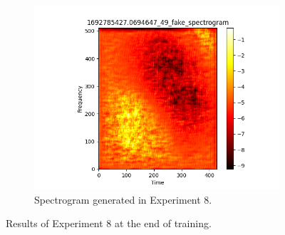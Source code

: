 \begin{figure}[!ht]
\begin{subfigure}{0.3\textwidth}
        \includegraphics[width=\textwidth]{figures/4.5-results/exp8_spectrogram.png}
        \caption{Spectrogram generated in Experiment 8.}
        \label{fig:exp8_spectrogram}
    \end{subfigure}
    \caption{Results of Experiment 8 at the end of training.}
    \label{fig:exp8_results}
\end{figure}